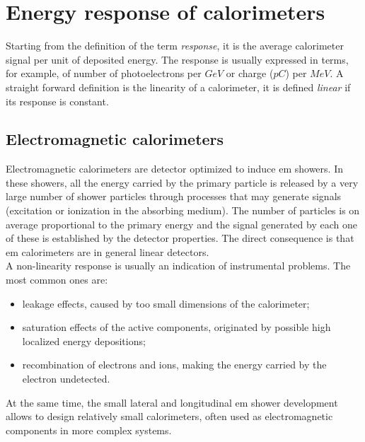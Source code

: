 \section{Energy response of calorimeters}
Starting from the definition of the term \textit{response}, it is the average calorimeter signal per unit of deposited energy. The response is usually expressed in  terms, for example, of number of photoelectrons per $GeV$ or charge ($pC$) per  $MeV$. A straight forward definition is the linearity of a calorimeter, it is defined \textit{linear} if its response is constant.\\

\subsection*{Electromagnetic calorimeters}
Electromagnetic calorimeters are detector optimized to induce em showers. In these showers, all the energy carried by the primary particle is released by a very large number of shower particles through processes that may generate signals (excitation or ionization in the absorbing medium). The number of particles is on average proportional to the primary energy and the signal generated by each one of these is established by the detector properties. The direct consequence is that em calorimeters are in general linear detectors.\\
A non-linearity response is usually an indication of instrumental problems. The most common ones are:
\begin{itemize}
    \item leakage effects, caused by too small dimensions of the calorimeter;
    \item saturation effects of the active components, originated by possible high localized energy depositions;
    \item recombination of electrons and ions, making the energy carried by the electron undetected.
\end{itemize}

At the same time, the small lateral and longitudinal em shower development allows to design relatively small calorimeters, often used as electromagnetic components in more complex systems.\\

